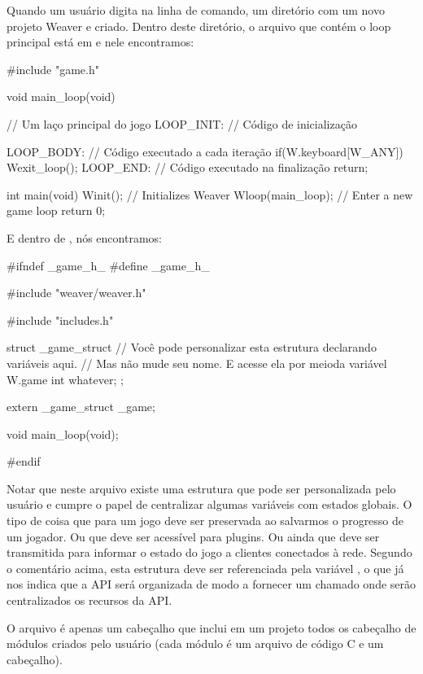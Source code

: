 

Quando um usuário digita  na linha de
comando, um diretório com um novo projeto Weaver e criado. Dentro
deste diretório, o arquivo que contém o loop principal está
em  e nele encontramos:

\alinhaverbatim
#include "game.h"

void main_loop(void){ // Um laço principal do jogo
 LOOP_INIT: // Código de inicialização 

 LOOP_BODY: // Código executado a cada iteração
    if(W.keyboard[W_ANY])
        Wexit_loop();
 LOOP_END: // Código executado na finalização
    return;
}

int main(void){
  Winit(); // Initializes Weaver
  Wloop(main_loop); // Enter a new game loop
  return 0;
}
\alinhanormal

E dentro de , nós encontramos:

\linha
\alinhaverbatim
#ifndef _game_h_
#define _game_h_

#include "weaver/weaver.h"

#include "includes.h"

struct _game_struct{
  // Você pode personalizar esta estrutura declarando variáveis aqui.
  // Mas não mude seu nome. E acesse ela por meioda variável W.game
  int whatever;
};

extern _game_struct _game;

void main_loop(void);

#endif
\alinhanormal
\linha

Notar que neste arquivo existe uma estrutura que pode ser
personalizada pelo usuário e cumpre o papel de centralizar algumas
variáveis com estados globais. O tipo de coisa que para um jogo deve
ser preservada ao salvarmos o progresso de um jogador. Ou que deve ser
acessível para plugins. Ou ainda que deve ser transmitida para
informar o estado do jogo a clientes conectados à rede. Segundo o
comentário acima, esta estrutura deve ser referenciada pela
variável , o que já nos indica que a API será
organizada de modo a fornecer um 
chamado  onde serão centralizados os recursos da API.

O arquivo  é apenas um cabeçalho que inclui em
um projeto todos os cabeçalho de módulos criados pelo usuário (cada
módulo é um arquivo de código C e um cabeçalho).

